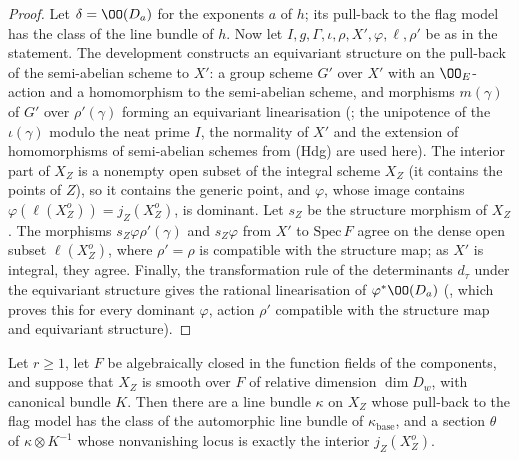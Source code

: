 \begin{proof}
Let $\delta=\OO(D_a)$ for the exponents $a$ of $h$; its pull-back to the flag model has the class of the line
bundle of $h$. Now let $I,g,\Gamma,\iota,\rho,X',\varphi,\ell,\rho'$ be as in the statement. The development
constructs an equivariant structure on the pull-back of the semi-abelian scheme to $X'$: a group scheme
$G'$ over $X'$ with an $\OO_E$-action and a homomorphism to the semi-abelian scheme, and morphisms
$m(\gamma)$ of $G'$ over $\rho'(\gamma)$ forming an equivariant linearisation
(; the unipotence of the $\iota(\gamma)$
modulo the neat prime $I$, the normality of $X'$ and the extension of homomorphisms of semi-abelian schemes
from (Hdg) are used here). The interior part of $X_Z$ is a nonempty open subset of
the integral scheme $X_Z$ (it contains the points of $Z$), so it contains the generic point, and $\varphi$, whose image contains
$\varphi(\ell(X_Z^o))=j_Z(X_Z^o)$, is dominant. Let $s_Z$ be the structure morphism of $X_Z$. The morphisms
$s_Z\varphi\rho'(\gamma)$ and $s_Z\varphi$ from $X'$ to $\mathrm{Spec}\,F$ agree on the dense open subset $\ell(X_Z^o)$,
where $\rho'=\rho$ is compatible with the structure map; as $X'$ is integral, they agree. Finally, the transformation rule of the determinants
$d_\tau$ under the equivariant structure gives the rational linearisation of $\varphi^*\OO(D_a)$
(, which proves this for
every dominant $\varphi$, action $\rho'$ compatible with the structure map and equivariant structure).
\end{proof}

\begin{theorem}\label{pf:lift1:kappa}
Let $r\ge1$, let $F$ be algebraically closed in the function fields of the components, and suppose that
$X_Z$ is smooth over $F$ of relative dimension $\dim D_w$, with canonical bundle $K$. Then there are a
line bundle $\kappa$ on $X_Z$ whose pull-back to the flag model has the class of the automorphic line
bundle of $\kappa_{\mathrm{base}}$, and a section $\theta$ of $\kappa\otimes K^{-1}$ whose nonvanishing locus
is exactly the interior $j_Z(X_Z^o)$.
\end{theorem}

